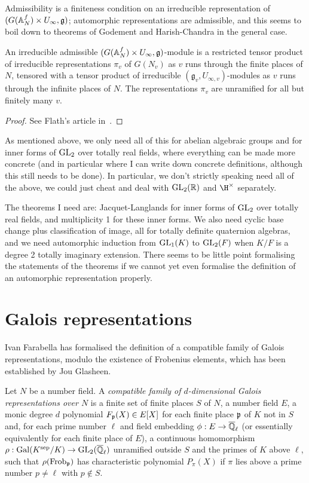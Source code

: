 Admissibility is a finiteness condition on an irreducible representation of $(G(\mathbb{A}_N^f)\times U_\infty,\mathfrak{g})$; automorphic representations are admissible, and this seems to boil down to theorems of Godement and Harish-Chandra in the general case. 


\begin{theorem} An irreducible admissible $(G(\mathbb{A}_N^f)\times U_\infty,\mathfrak{g})$-module is a restricted tensor product of irreducible representations $\pi_v$ of $G(N_v)$ as $v$ runs through the finite places of $N$, tensored with a tensor product of irreducible $(\mathfrak{g}_v,U_{\infty,v})$-modules as $v$ runs through the infinite places of $N$. The representations $\pi_v$ are unramified for all but finitely many $v$.
\end{theorem}
\begin{proof} See Flath's article in~\cite{corvallis1}.
\end{proof}

As mentioned above, we only need all of this for abelian algebraic groups and for inner forms of $\operatorname{GL}_2$ over totally real fields, where everything can be made more concrete (and in particular where I can write down concrete definitions, although this still needs to be done). In particular, we don't strictly speaking need all of the above, we could just cheat and deal with $\operatorname{GL}_2(\mathbb{R})$ and $\H^\times$ separately.

The theorems I need are: Jacquet-Langlands for inner forms of $\operatorname{GL}_2$ over totally real fields, 
and multiplicity 1 for these inner forms. We also need cyclic base change plus classification of image, all for totally definite quaternion algebras, and we need
automorphic induction from $\operatorname{GL}_1(K)$ to $\operatorname{GL}_2(F)$ when $K/F$ is a degree 2 totally imaginary extension. There seems to be little point formalising the statements of the theorems if we cannot yet even formalise the definition of an automorphic representation properly.

\section{Galois representations}

Ivan Farabella has formalised the definition of a compatible family of Galois
representations, modulo the existence of Frobenius elements, which has been
established by Jou Glasheen. 

\begin{definition}\leanok Let $N$ be a number field. A \emph{compatible family of $d$-dimensional Galois representations over $N$} is a finite set of finite places $S$ of $N$,
a number field $E$, a monic degree $d$ polynomial $F_{{\mathfrak{p}}}(X)\in E[X]$ for each finite place ${\mathfrak{p}}$ of $K$ not in $S$ and, for each prime number $\ell$ and field embedding $\phi : E\to\overline{\mathbb{Q}}_\ell$ (or essentially equivalently for each finite place of $E$), a continuous homomorphism $\rho:\operatorname{Gal}(K^{\operatorname{sep}}/K)\to\operatorname{GL}_2(\overline{\mathbb{Q}}_\ell)$ unramified outside $S$ and the primes of $K$ above $\ell$, such that $\rho(\operatorname{Frob}_{\mathfrak{p}})$ has characteristic polynomial $P_\pi(X)$ if $\pi$ lies above a prime number $p\not=\ell$ with $p\not\in S$.
\end{definition}

